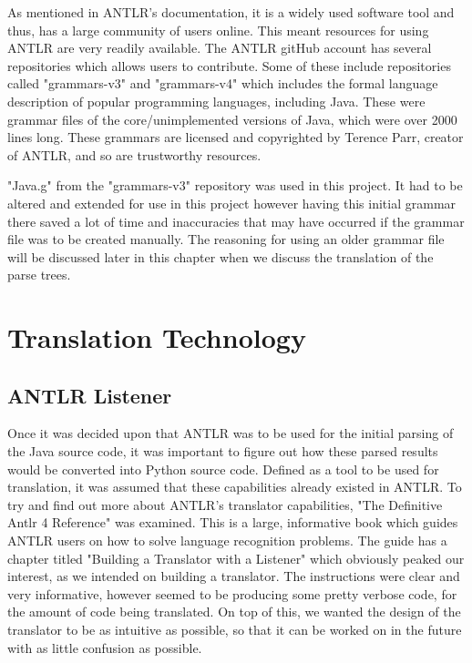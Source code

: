 \documentclass{l4proj}
\begin{document}
As mentioned in ANTLR's documentation, it is a widely used software tool and thus, has a large community of users online. This meant resources for using ANTLR are very readily available. The ANTLR gitHub account has several repositories which allows users to contribute. Some of these include repositories called "grammars-v3" and "grammars-v4" which includes the formal language description of popular programming languages, including Java. These were grammar files of the core/unimplemented versions of Java, which were over 2000 lines long. These grammars are licensed and copyrighted by Terence Parr, creator of ANTLR, and so are trustworthy resources.

"Java.g" from the "grammars-v3" repository was used in this project. It had to be altered and extended for use in this project however having this initial grammar there saved a lot of time and inaccuracies that may have occurred if the grammar file was to be created manually. The reasoning for using an older grammar file will be discussed later in this chapter when we discuss the translation of the parse trees.

\section{Translation Technology}

\subsection{ANTLR Listener}
Once it was decided upon that ANTLR was to be used for the initial parsing of the Java source code, it was important to figure out how these parsed results would be converted into Python source code. Defined as a tool to be used for translation, it was assumed that these capabilities already existed in ANTLR. To try and find out more about ANTLR's translator capabilities, "The Definitive Antlr 4 Reference" was examined. This is a large, informative book which guides ANTLR users on how to solve language recognition problems. The guide has a chapter titled "Building a Translator with a Listener" which obviously peaked our interest, as we intended on building a translator. The instructions were clear and very informative, however seemed to be producing some pretty verbose code, for the amount of code being translated. On top of this, we wanted the design of the translator to be as intuitive as possible, so that it can be worked on in the future with as little confusion as possible.
\end{document}
